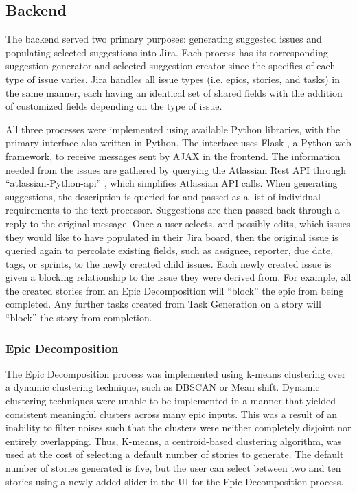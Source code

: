 \subsection{Backend}

The backend served two primary purposes: generating suggested issues and populating selected suggestions into Jira. Each process has its corresponding suggestion generator and selected suggestion creator since the specifics of each type of issue varies. Jira handles all issue types (i.e. epics, stories, and tasks) in the same manner, each having an identical set of shared fields with the addition of customized fields depending on the type of issue.

All three processes were implemented using available Python libraries, with the primary interface also written in Python. The interface uses Flask \cite{flask}, a Python web framework, to receive messages sent by AJAX in the frontend. The information needed from the issues are gathered by querying the Atlassian Rest API \cite{jira5} through “atlassian-Python-api” \cite{jiraPython}, which simplifies Atlassian API calls. When generating suggestions, the description is queried for and passed as a list of individual requirements to the text processor. Suggestions are then passed back through a reply to the original message. Once a user selects, and possibly edits, which issues they would like to have populated in their Jira board, then the original issue is queried again to percolate existing fields, such as assignee, reporter, due date, tags, or sprints, to the newly created child issues. Each newly created issue is given a blocking relationship to the issue they were derived from. For example, all the created stories from an Epic Decomposition will “block” the epic from being completed. Any further tasks created from Task Generation on a story will “block” the story from completion.

\subsubsection{Epic Decomposition}

The Epic Decomposition process was implemented using k-means clustering over a dynamic clustering technique, such as DBSCAN or Mean shift. Dynamic clustering techniques were unable to be implemented in a manner that yielded consistent meaningful clusters across many epic inputs. This was a result of an inability to filter noises such that the clusters were neither completely disjoint nor entirely overlapping. Thus, K-means, a centroid-based clustering algorithm, was used at the cost of selecting a default number of stories to generate. The default number of stories generated is five, but the user can select between two and ten stories using a newly added slider in the UI for the Epic Decomposition process.


